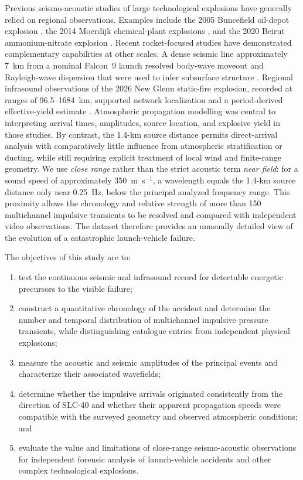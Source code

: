 \documentclass[]{seismica}
\begin{document}
Previous seismo-acoustic studies of large technological explosions have
generally relied on regional observations. Examples include the 2005 Buncefield
oil-depot explosion \citep{ottemoller_2008,ceranna_2009,green_2008}, the 2014
Moerdijk chemical-plant explosions \citep{smink_2019}, and the 2020 Beirut
ammonium-nitrate explosion \citep{pilger_beirut_2021,kim_pasyanos_2022}.
Recent rocket-focused studies have demonstrated complementary capabilities at
other scales. A dense seismic line approximately 7~km from a nominal Falcon~9
launch resolved body-wave moveout and Rayleigh-wave dispersion that were used
to infer subsurface structure \citep{schuster_rocketquake_2025}. Regional
infrasound observations of the 2026 New Glenn static-fire explosion, recorded
at ranges of 96.5--1684~km, supported network localization and a
period-derived effective-yield estimate \citep{silber_scamfer_newglenn_2026}.
Atmospheric propagation modelling was central to interpreting arrival times,
amplitudes, source location, and explosive yield in those studies. By contrast,
the 1.4-km source distance permits direct-arrival analysis with comparatively
little influence from atmospheric stratification or ducting, while still
requiring explicit treatment of local wind and finite-range geometry. We use
\emph{close range} rather than the strict acoustic term \emph{near field}: for
a sound speed of approximately 350~m~s$^{-1}$, a wavelength equals the 1.4-km
source distance only near 0.25~Hz, below the principal analyzed frequency
range. This proximity allows the chronology and
relative strength of more than 150 multichannel impulsive transients to be resolved
and compared with independent video observations. The dataset therefore
provides an unusually detailed view of the evolution of a catastrophic
launch-vehicle failure.

The objectives of this study are to:
\begin{enumerate}
  \item test the continuous seismic and infrasound record for detectable
        energetic precursors to the visible failure;
  \item construct a quantitative chronology of the accident and determine the
        number and temporal distribution of multichannel impulsive pressure
        transients, while distinguishing catalogue entries from independent
        physical explosions;
  \item measure the acoustic and seismic amplitudes of the principal events
        and characterize their associated wavefields;
  \item determine whether the impulsive arrivals originated consistently from
        the direction of SLC-40 and whether their apparent propagation speeds
        were compatible with the surveyed geometry and observed atmospheric
        conditions; and
  \item evaluate the value and limitations of close-range seismo-acoustic
        observations for independent forensic analysis of launch-vehicle
        accidents and other complex technological explosions.
\end{enumerate}
\end{document}
